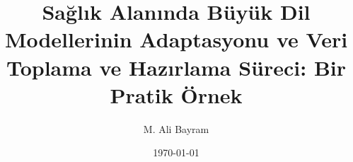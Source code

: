 \documentclass{article}
\begin{document}
\title{Sağlık Alanında Büyük Dil Modellerinin Adaptasyonu ve Veri Toplama ve Hazırlama Süreci: Bir Pratik Örnek}
\author{M. Ali Bayram}
\date{\today}

\maketitle
\end{document}
